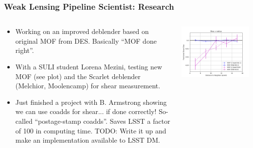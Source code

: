 \documentclass[aspectratio=169]{beamer}
\begin{document}
\frame
{

    \frametitle{Weak Lensing Pipeline Scientist: Research}


    \begin{columns}
        \begin{column}{0.5\textwidth}

            \begin{itemize}

                \item Working on an improved deblender based on original
                    MOF from DES.  Basically ``MOF done right''.

                \item With a SULI student Lorena Mezini, testing new MOF
                    (see plot) and the Scarlet deblender (Melchior, Moolencamp)
                    for shear measurement.

                \item Just finished a project with B. Armstrong showing we can use coadds
                    for shear... if done correctly!  So-called ``postage-stamp
                    coadds''.  Saves LSST a factor of 100 in computing
                    time. TODO: Write it up and make an implementation
                    available to LSST DM.

            \end{itemize}
        \end{column}
        \begin{column}{0.5\textwidth}
            \begin{center}
                \includegraphics[width=\textwidth]{bias-v-rad-MOF-multiband.png}
            \end{center}
        \end{column}

    \end{columns}

}
\end{document}
